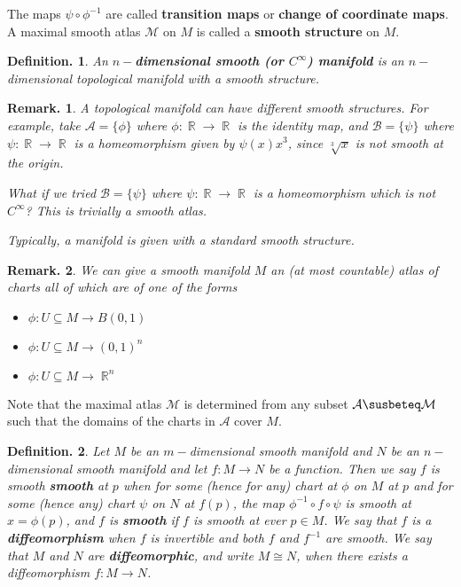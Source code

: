 \documentclass[11pt, a4paper]{memoir}
\DeclareMathOperator{\R}{{\mathbb{R}}}
\theoremstyle{change}
\theoremstyle{plain}
\theoremstyle{nonumberplain}
\newtheorem{definition}{Definition.}
\newtheorem{remark}{Remark.}
\numberwithin{equation}{section}
\begin{document}
The maps $\psi\circ\phi^{-1}$ are called \textbf{transition maps} or \textbf{change of coordinate maps}.
A maximal smooth atlas $\mathcal{M}$ on $M$ is called a \textbf{smooth structure} on $M$.
\begin{definition}
    An \textbf{$n-$dimensional smooth (or $C^\infty$) manifold} is an $n-$dimensional topological manifold with a smooth structure.
\end{definition}
\begin{remark}
    A topological manifold can have different smooth structures.
    For example, take $\mathcal{A}=\{\phi\}$ where $\phi:\R\to\R$ is the identity map, and $\mathcal{B}=\{\psi\}$ where $\psi:\R\to\R$ is a homeomorphism given by $\psi(x)x^3$, since $\sqrt[3]{x}$ is not smooth at the origin.

    What if we tried $\mathcal{B}=\{\psi\}$ where $\psi:\R\to\R$ is a homeomorphism which is not $C^\infty$?
    This is trivially a smooth atlas.

    Typically, a manifold is given with a standard smooth structure.
\end{remark}
\begin{remark}
    We can give a smooth manifold $M$ an (at most countable) atlas of charts all of which are of one of the forms
    \begin{itemize}[nl]
        \item $\phi:U\subseteq M\to B(0,1)$
        \item $\phi:U\subseteq M\to (0,1)^n$
        \item $\phi:U\subseteq M\to\R^n$
    \end{itemize}
\end{remark}
Note that the maximal atlas $\mathcal{M}$ is determined from any subset $\mathcal{A}\susbeteq\mathcal{M}$ such that the domains of the charts in $\mathcal{A}$ cover $M$.
\begin{definition}
    Let $M$ be an $m-$dimensional smooth manifold and $N$ be an $n-$dimensional smooth manifold and let $f:M\to N$ be a function.
    Then we say $f$ is smooth \textbf{smooth} at $p$ when for some (hence for any) chart at $\phi$ on $M$ at $p$ and for some (hence any) chart $\psi$ on $N$ at $f(p)$, the map $\phi^{-1}\circ f\circ\psi$ is smooth at $x=\phi(p)$, and $f$ is \textbf{smooth} if $f$ is smooth at ever $p\in M$.
    We say that $f$ is a \textbf{diffeomorphism} when $f$ is invertible and both $f$ and $f^{-1}$ are smooth.
    We say that $M$ and $N$ are \textbf{diffeomorphic}, and write $M\cong N$, when there exists a diffeomorphism $f:M\to N$.
\end{definition}
\end{document}
